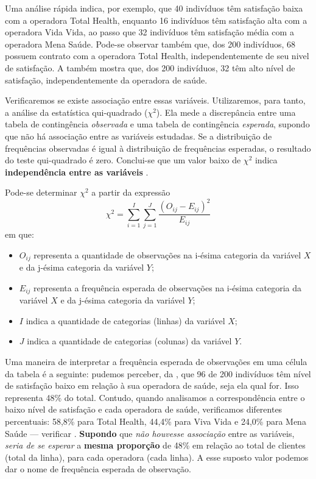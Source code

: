 \begin{sol}
Uma análise rápida indica, por exemplo, que 40 indivíduos têm satisfação baixa
com a operadora Total Health, enquanto 16 indivíduos têm satisfação alta com a
operadora Vida Vida, ao passo que 32 indivíduos têm satisfação média com a
operadora Mena Saúde. Pode-se observar também que, dos 200 indivíduos, 68
possuem contrato com a operadora Total Health, independentemente de seu nivel
de satisfação. A  também mostra que, dos 200
indivíduos, 32 têm alto nível de satisfação, independentemente da operadora de
saúde.

Verificaremos se existe associação entre essas variáveis.
Utilizaremos, para tanto, a análise da estatística qui-quadrado ($\chi^2$).
Ela mede a discrepância entre uma tabela de contingência \emph{observada} e uma
tabela de contingência \emph{esperada}, supondo que não há associação entre as
variáveis estudadas. Se a distribuição de frequências observadas é igual à
distribuição de frequências esperadas, o resultado do teste qui-quadrado é
zero. Conclui-se que um valor baixo de $\chi^2$ indica \textbf{independência
entre as variáveis} \parencite[p.~237]{favero}.

Pode-se determinar $\chi^2$ a partir da expressão
\begin{equation}
    \chi^2 = \sum_{i=1}^{I} \sum_{j=1}^{J} \frac{(O_{ij} - E_{ij})^2}{E_{ij}}
    \label{eq:qui-quadrado}
\end{equation}
em que:
\begin{itemize}
    \item $O_{ij}$ representa a quantidade de observações na i-ésima categoria
    da variável $X$ e da j-ésima categoria da variável $Y$;
    \item $E_{ij}$ representa a frequência esperada de observações na i-ésima
    categoria da variável $X$ e da j-ésima categoria da variável $Y$;
    \item $I$ indica a quantidade de categorias (linhas) da variável $X$;
    \item $J$ indica a quantidade de categorias (colunas) da variável $Y$.
\end{itemize}

Uma maneira de interpretar a frequência esperada de observações em uma célula
da tabela é a seguinte: pudemos perceber, da ,
que 96 de 200 indivíduos têm nível de satisfação baixo em relação à sua
operadora de saúde, seja ela qual for. Isso representa 48\% do total. Contudo,
quando analisamos a correspondência entre o baixo nível de satisfação e cada
operadora de saúde, verificamos diferentes percentuais: 58,8\% para Total
Health, 44,4\% para Viva Vida e 24,0\% para Mena Saúde --- verificar
.
\textbf{Supondo} que \emph{não houvesse associação} entre as variáveis,
\emph{seria de se esperar} a \textbf{mesma proporção} de 48\% em relação ao
total de clientes (total da linha), para cada operadora (cada linha). A esse
suposto valor podemos dar o nome de frequência esperada de observação.


\end{sol}
